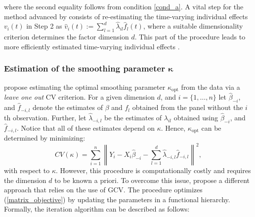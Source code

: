 where the second equality follows from condition \ref{cond_a}. A vital step for the method advanced by \citet{kneip2012new} consists of re-estimating the time-varying individual effects $v_i(t)$ in Step 2 as $\hat{v}_i(t) := \sum_{l=1}^d \hat{\lambda}_{il}  \hat{f}_l(t) $, where a suitable dimensionality criterion determines the factor dimension $d$. This part of the procedure leads to more efficiently estimated time-varying individual effects \citep{bada2012phtt}. 

\subsubsection{Estimation of the smoothing parameter $\mathbf{\kappa}$}

\citet{kneip2012new} propose estimating the optimal smoothing parameter $\kappa_{\text{opt}}$ from the data via a \textit{leave one out} \ac{CV} criterion. For a given dimension $d$, and $i = \{1, \ldots, n\}$ let $\hat{\beta}_{-i}$, and $\hat{f}_{-i, l}$ denote the estimates of $\beta$ and $f_l$ obtained from the panel without the $i$th observation. Further, let $\hat{\lambda}_{-i, l}$ be the estimates of $\lambda_{il}$ obtained using $\hat{\beta}_{-i}$, and $\hat{f}_{-i, l}$. Notice that all of these estimates depend on $\kappa$. Hence, $\kappa_{\text{opt}}$ can be determined by minimizing: 
\begin{equation}\label{cv_kniep}
    C V(\kappa)=\sum_{i=1}^n\left\|Y_i-X_i \hat{\beta}_{-i}-\sum_{l=1}^d \hat{\lambda}_{-i, l} \hat{f}_{-i, l}\right\|^2,
\end{equation}
with respect to $\kappa$. However, this procedure is computationally costly and requires the dimension $d$ to be known a priori. To overcome this issue, \citet{bada2012phtt} propose a different approach that relies on the use of \ac{GCV}. The procedure optimizes (\ref{matrix_objective}) by updating the parameters in a functional hierarchy. Formally, the iteration algorithm can be described as follows:

